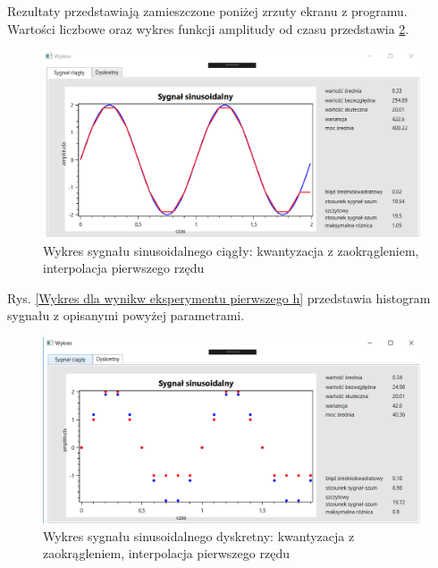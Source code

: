 \documentclass[12pt]{article}
\begin{document}
Rezultaty przedstawiają zamieszczone poniżej zrzuty ekranu z programu. Wartości liczbowe oraz wykres funkcji amplitudy od czasu przedstawia \ref{Histogram dla wyników eksperymentu drugiego}.
\begin{figure}[h!]
 \centering
 \includegraphics[width=12.3cm]{SinKwantZaokrIntA2T2f10H2t1C.PNG}
 \vspace{-0.3cm}
 \caption{Wykres sygnału sinusoidalnego ciągły: kwantyzacja z zaokrągleniem, interpolacja pierwszego rzędu}
 \label{Wykres dla wyników eksperymentu drugiego}
\end{figure}
\newpage
Rys. \ref{Wykres dla wynikw eksperymentu pierwszego h} przedstawia histogram sygnału z opisanymi powyżej parametrami. 
\begin{figure}[h!]
 \centering
 \includegraphics[width=12.3cm]{SinKwantZaokrIntA2T2f10H2t1D.PNG}
 \vspace{-0.3cm}
 \caption{Wykres sygnału sinusoidalnego dyskretny: kwantyzacja z zaokrągleniem, interpolacja pierwszego rzędu}
 \label{Histogram dla wyników eksperymentu drugiego}
\end{figure}

\end{document}
